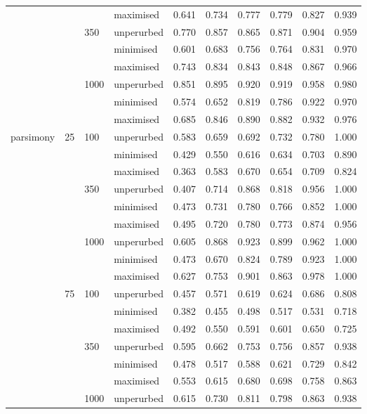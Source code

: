 \begin{longtable}{llllrrrrrr}
   &  &  & maximised & 0.641 & 0.734 & 0.777 & 0.779 & 0.827 & 0.939 \\ 
   &  & 350 & unperurbed & 0.770 & 0.857 & 0.865 & 0.871 & 0.904 & 0.959 \\ 
   &  &  & minimised & 0.601 & 0.683 & 0.756 & 0.764 & 0.831 & 0.970 \\ 
   &  &  & maximised & 0.743 & 0.834 & 0.843 & 0.848 & 0.867 & 0.966 \\ 
   &  & 1000 & unperurbed & 0.851 & 0.895 & 0.920 & 0.919 & 0.958 & 0.980 \\ 
   &  &  & minimised & 0.574 & 0.652 & 0.819 & 0.786 & 0.922 & 0.970 \\ 
   &  &  & maximised & 0.685 & 0.846 & 0.890 & 0.882 & 0.932 & 0.976 \\ 
  parsimony & 25 & 100 & unperurbed & 0.583 & 0.659 & 0.692 & 0.732 & 0.780 & 1.000 \\ 
   &  &  & minimised & 0.429 & 0.550 & 0.616 & 0.634 & 0.703 & 0.890 \\ 
   &  &  & maximised & 0.363 & 0.583 & 0.670 & 0.654 & 0.709 & 0.824 \\ 
   &  & 350 & unperurbed & 0.407 & 0.714 & 0.868 & 0.818 & 0.956 & 1.000 \\ 
   &  &  & minimised & 0.473 & 0.731 & 0.780 & 0.766 & 0.852 & 1.000 \\ 
   &  &  & maximised & 0.495 & 0.720 & 0.780 & 0.773 & 0.874 & 0.956 \\ 
   &  & 1000 & unperurbed & 0.605 & 0.868 & 0.923 & 0.899 & 0.962 & 1.000 \\ 
   &  &  & minimised & 0.473 & 0.670 & 0.824 & 0.789 & 0.923 & 1.000 \\ 
   &  &  & maximised & 0.627 & 0.753 & 0.901 & 0.863 & 0.978 & 1.000 \\ 
   & 75 & 100 & unperurbed & 0.457 & 0.571 & 0.619 & 0.624 & 0.686 & 0.808 \\ 
   &  &  & minimised & 0.382 & 0.455 & 0.498 & 0.517 & 0.531 & 0.718 \\ 
   &  &  & maximised & 0.492 & 0.550 & 0.591 & 0.601 & 0.650 & 0.725 \\ 
   &  & 350 & unperurbed & 0.595 & 0.662 & 0.753 & 0.756 & 0.857 & 0.938 \\ 
   &  &  & minimised & 0.478 & 0.517 & 0.588 & 0.621 & 0.729 & 0.842 \\ 
   &  &  & maximised & 0.553 & 0.615 & 0.680 & 0.698 & 0.758 & 0.863 \\ 
   &  & 1000 & unperurbed & 0.615 & 0.730 & 0.811 & 0.798 & 0.863 & 0.938 \\ 

\end{longtable}

